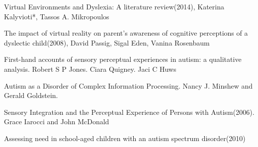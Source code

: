 \documentclass[11pt]{report}
\begin{document}
\begin{thebibliography}{9}
Virtual Environments and Dyslexia: A literature review(2014), Katerina Kalyvioti*, Tassos A. Mikropoulos 

The impact of virtual reality on parent's awareness of cognitive perceptions of a dyslectic child(2008), David Passig, Sigal Eden, Vanina Rosenbaum

First-hand accounts of sensory perceptual experiences in autism: a qualitative analysis. Robert S P Jones. Ciara Quigney. Jaci C Huws

Autism as a Disorder of Complex Information Processing. Nancy J. Minshew and Gerald Goldstein. 

Sensory Integration and the Perceptual Experience of Persons with Autism(2006). Grace Iarocci and John McDonald

Assessing need in school-aged children with an autism spectrum disorder(2010)

\end{thebibliography}
\end{document}

